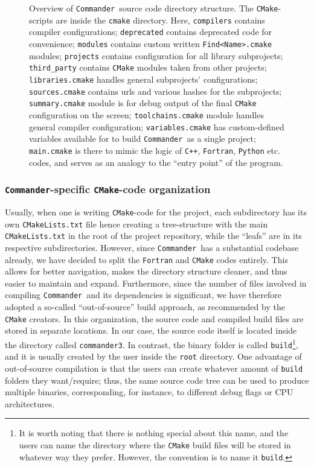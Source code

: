 \documentclass[twocolumn]{aa}
\def\commander{\texttt{Commander}}
\begin{document}
\begin{figure}[t]
\begin{center}
\end{center}
    \caption{Overview of \commander\ source code directory structure. 
    The \texttt{CMake}-scripts are inside the \texttt{cmake} directory. Here, 
    \texttt{compilers} contains compiler configurations; 
    \texttt{deprecated} contains deprecated code for convenience; 
    \texttt{modules} contains custom written \texttt{Find<Name>.cmake} modules; 
    \texttt{projects} contains configuration for all library subprojects; 
    \texttt{third\_party} contains \texttt{CMake} modules taken from other projects; 
    \texttt{libraries.cmake} handles general subprojects' configurations; 
    \texttt{sources.cmake} contains urls and various hashes for the subprojects; 
    \texttt{summary.cmake} module is for debug output of the final \texttt{CMake} configuration 
    on the screen; 
    \texttt{toolchains.cmake} module handles general compiler configuration; 
    \texttt{variables.cmake} has custom-defined variables available for to build \commander\
    as a single project; 
    \texttt{main.cmake} is there to mimic the logic of \texttt{C++}, \texttt{Fortran}, 
    \texttt{Python} etc. codes, and serves as an analogy to the ``entry point'' of the program.}
    \label{fig:source}
\end{figure}


\subsubsection{\commander-specific \texttt{CMake}-code organization}

Usually, when one is writing \texttt{CMake}-code for the project, each subdirectory has its own \texttt{CMakeLists.txt} file hence creating a tree-structure with the main \texttt{CMakeLists.txt} in the root of the project repository, while the ``leafs'' are in its respective subdirectories. However, since \commander\ has a substantial codebase already, we have decided to split the \texttt{Fortran} and \texttt{CMake} codes entirely. This allows for better navigation, makes the directory structure cleaner, and thus easier to maintain and expand. Furthermore, since the number of files involved in compiling \commander\ and its dependencies is significant, we have therefore adopted a so-called ``out-of-source'' build approach, as recommended by the \texttt{CMake} creators. In this organization, the source code and compiled build files are stored in separate locations. In our case, the source code itself is located inside the directory called \texttt{commander3}. In contrast, the binary folder is called \texttt{build}\footnote{It is worth noting that there is nothing special about this name, and the users can name the directory where the \texttt{CMake} build files will be stored in whatever way they prefer. However, the convention is to name it \texttt{build}.}, and it is usually created by the user inside the \texttt{root} directory. One advantage of out-of-source compilation is that the users can create whatever amount of \texttt{build} folders they want/require; thus, the same source code tree can be used to produce multiple binaries, corresponding, for instance, to different debug flags or CPU architectures.
\end{document}
